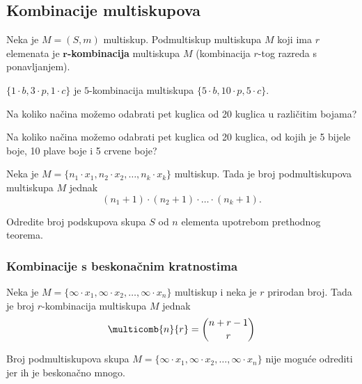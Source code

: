 \subsection{Kombinacije multiskupova}

Neka je $M = (S, m)$ multiskup.
Podmultiskup multiskupa $M$ koji ima $r$ elemenata je \textbf{$\mathbf{r}$-kombinacija} multiskupa $M$ (kombinacija $r$-tog razreda s ponavljanjem).

\begin{example}
    $\{1 \cdot b, 3 \cdot p, 1 \cdot c\}$ je $5$-kombinacija multiskupa $\{5
    \cdot b, 10 \cdot p, 5 \cdot c\}$.
\end{example}

\begin{example}
    Na koliko načina možemo odabrati pet kuglica od 20 kuglica u različitim
    bojama?
\end{example}

\begin{example}
    Na koliko načina možemo odabrati pet kuglica od 20 kuglica, od kojih je 5
    bijele boje, 10 plave boje i 5 crvene boje?
\end{example}

\begin{theorem}
    Neka je $M = \{n_1 \cdot x_1, n_2 \cdot x_2, \dots, n_k \cdot x_k\}$
    multiskup. Tada je broj podmultiskupova multiskupa $M$ jednak
    $$
        (n_1 + 1) \cdot (n_2 + 1) \cdot \dots \cdot (n_k + 1).
    $$
\end{theorem}

\begin{example}
    Odredite broj podskupova skupa $S$ od $n$ elementa upotrebom prethodnog
    teorema.
\end{example}

\subsubsection{Kombinacije s beskonačnim kratnostima}

\begin{theorem}
    Neka je $M=\{\infty \cdot x_1, \infty \cdot x_2, \dots, \infty \cdot x_n\}$
    multiskup i neka je $r$ prirodan broj. Tada je broj $r$-kombinacija
    multiskupa $M$ jednak
    $$
        \multicomb{n}{r} = \binom{n + r - 1}{r}
    $$
\end{theorem}

Broj podmultiskupova skupa $M=\{\infty \cdot x_1, \infty \cdot x_2, \dots,
\infty \cdot x_n\}$ nije moguće odrediti jer ih je beskonačno mnogo.

